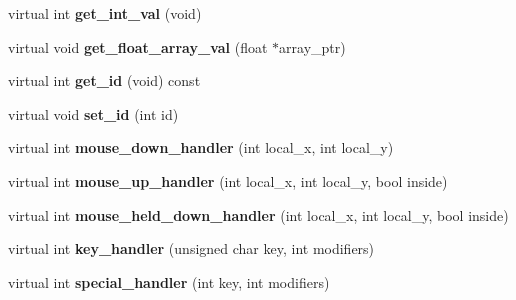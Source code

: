 \begin{DoxyCompactItemize}
\item 
\hypertarget{class_g_l_u_i___control_a3ee80f39e04a26e38bc5e16f0f8af539}{virtual int {\bfseries get\+\_\+int\+\_\+val} (void)}\label{class_g_l_u_i___control_a3ee80f39e04a26e38bc5e16f0f8af539}

\item 
\hypertarget{class_g_l_u_i___control_ae918e20641bc57c690d033f6533d2e29}{virtual void {\bfseries get\+\_\+float\+\_\+array\+\_\+val} (float $\ast$array\+\_\+ptr)}\label{class_g_l_u_i___control_ae918e20641bc57c690d033f6533d2e29}

\item 
\hypertarget{class_g_l_u_i___control_a855a5f2c0267a303b39f685284913b40}{virtual int {\bfseries get\+\_\+id} (void) const }\label{class_g_l_u_i___control_a855a5f2c0267a303b39f685284913b40}

\item 
\hypertarget{class_g_l_u_i___control_ad27f17ac45b13fb12d623f269d76db14}{virtual void {\bfseries set\+\_\+id} (int id)}\label{class_g_l_u_i___control_ad27f17ac45b13fb12d623f269d76db14}

\item 
\hypertarget{class_g_l_u_i___control_a92b77565168a1d2003bca1c16ac00e8d}{virtual int {\bfseries mouse\+\_\+down\+\_\+handler} (int local\+\_\+x, int local\+\_\+y)}\label{class_g_l_u_i___control_a92b77565168a1d2003bca1c16ac00e8d}

\item 
\hypertarget{class_g_l_u_i___control_ac32aad8f69134d03682e34d0488a18f1}{virtual int {\bfseries mouse\+\_\+up\+\_\+handler} (int local\+\_\+x, int local\+\_\+y, bool inside)}\label{class_g_l_u_i___control_ac32aad8f69134d03682e34d0488a18f1}

\item 
\hypertarget{class_g_l_u_i___control_a4b44e44c1c455adc7f98c63aeb6aa919}{virtual int {\bfseries mouse\+\_\+held\+\_\+down\+\_\+handler} (int local\+\_\+x, int local\+\_\+y, bool inside)}\label{class_g_l_u_i___control_a4b44e44c1c455adc7f98c63aeb6aa919}

\item 
\hypertarget{class_g_l_u_i___control_a7f9da8ca7df99bd4cf394a9fd8ce19f1}{virtual int {\bfseries key\+\_\+handler} (unsigned char key, int modifiers)}\label{class_g_l_u_i___control_a7f9da8ca7df99bd4cf394a9fd8ce19f1}

\item 
\hypertarget{class_g_l_u_i___control_ab08da363df3f3eae867dd5ae61200f23}{virtual int {\bfseries special\+\_\+handler} (int key, int modifiers)}\label{class_g_l_u_i___control_ab08da363df3f3eae867dd5ae61200f23}


\end{DoxyCompactItemize}
